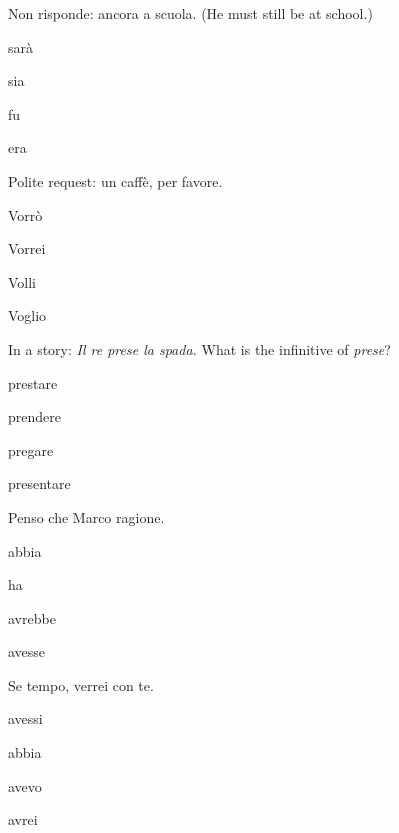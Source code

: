 \documentclass[11pt,a4paper,twoside,openright]{book}
\newcommand{\blank}{\underline{\hspace{2.6cm}}}
\begin{document}
\begin{exercises}
\item\label{ex:diag-16}\relax Non risponde: \blank{} ancora a scuola. (He must still be at school.)\par\nopagebreak\begin{options}
\item\relax sarà
\item\relax sia
\item\relax fu
\item\relax era
\end{options}
\item\label{ex:diag-17}\relax Polite request: \blank{} un caffè, per favore.\par\nopagebreak\begin{options}
\item\relax Vorrò
\item\relax Vorrei
\item\relax Volli
\item\relax Voglio
\end{options}
\item\label{ex:diag-18}\relax In a story: \textit{Il re prese la spada.} What is the infinitive of \textit{prese}?\par\nopagebreak\begin{options}
\item\relax prestare
\item\relax prendere
\item\relax pregare
\item\relax presentare
\end{options}
\item\label{ex:diag-19}\relax Penso che Marco \blank{} ragione.\par\nopagebreak\begin{options}
\item\relax abbia
\item\relax ha
\item\relax avrebbe
\item\relax avesse
\end{options}
\item\label{ex:diag-20}\relax Se \blank{} tempo, verrei con te.\par\nopagebreak\begin{options}
\item\relax avessi
\item\relax abbia
\item\relax avevo
\item\relax avrei
\end{options}
\end{exercises}
\end{document}
